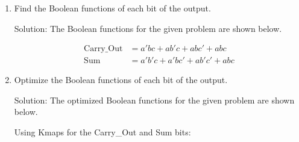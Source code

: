 \documentclass[table]{article}
\begin{document}
\begin{enumerate}
\begin{enumerate}
        \begin{table}[H]
            \centering
            \caption{Truth Table for the given problem (Part 2.2.a)}
            \label{tab:part22a}
        \end{table}

        \item Find the Boolean functions of each bit of the output.
        
        Solution: The Boolean functions for the given problem are shown below.

        \begin{align}
            \text{Carry\_Out} &= a'bc + ab'c + abc' + abc \\
            \text{Sum} &= a'b'c + a'bc' + ab'c' + abc
        \end{align}
        
        \item Optimize the Boolean functions of each bit of the output.
        
        Solution: The optimized Boolean functions for the given problem are shown below.

        Using Kmaps for the Carry\_Out and Sum bits:


\end{enumerate}
\end{enumerate}
\end{document}

